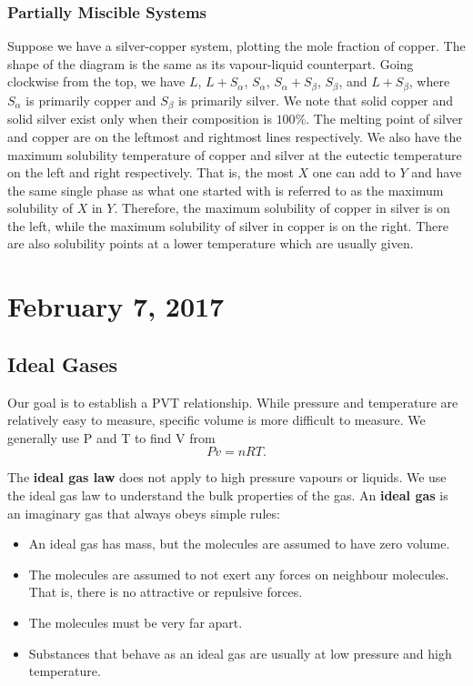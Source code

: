 \documentclass[11pt]{article}
\theoremstyle{plain} %
\theoremstyle{definition}
\theoremstyle{example}
\theoremstyle{remark}
\begin{document}
\subsubsection{Partially Miscible Systems}

Suppose we have a silver-copper system, plotting the mole fraction of copper. The shape of the diagram is the same as its vapour-liquid counterpart. Going clockwise from the top, we have $L$, $L+S_{\alpha}$, $S_{\alpha}$, $S_{\alpha}+S_{\beta}$, $S_{\beta}$, and $L + S_{\beta}$, where $S_{\alpha}$ is primarily copper and $S_{\beta}$ is primarily silver. We note that solid copper and solid silver exist only when their composition is $100\%$. The melting point of silver and copper are on the leftmost and rightmost lines respectively. We also have the maximum solubility temperature of copper and silver at the eutectic temperature on the left and right respectively. That is, the most $X$ one can add to $Y$ and have the same single phase as what one started with is referred to as the maximum solubility of $X$ in $Y$. Therefore, the maximum solubility of copper in silver is on the left, while the maximum solubility of silver in copper is on the right. There are also solubility points at a lower temperature which are usually given. 


\section{February 7, 2017}
\subsection{Ideal Gases}

Our goal is to establish a PVT relationship. While pressure and temperature are relatively easy to measure, specific volume is more difficult to measure. We generally use P and T to find V from $$Pv = nRT.$$

The \textbf{ideal gas law} does not apply to high pressure vapours or liquids. We use the ideal gas law to understand the bulk properties of the gas. An \textbf{ideal gas} is an imaginary gas that always obeys simple rules:
\begin{itemize}
	\item An ideal gas has mass, but the molecules are assumed to have zero volume.
	\item The molecules are assumed to not exert any forces on neighbour molecules. That is, there is no attractive or repulsive forces.
	\item The molecules must be very far apart. 
	\item Substances that behave as an ideal gas are usually at low pressure and high temperature. 
\end{itemize}
\end{document}
